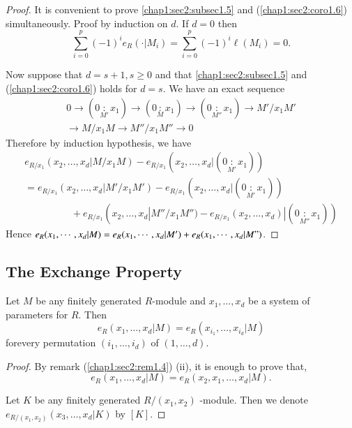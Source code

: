 \begin{proof}
  It is convenient to prove \ref{chap1:sec2:subsec1.5} and
  (\ref{chap1:sec2:coro1.6}) simultaneously. Proof by 
  induction on $d$. If $d=0$ then 
  $$
  \sum_{i=0}^{p} (-1)^i e_R (\cdot |M_i) = \sum^{p}_{i=0} (-1)^i \ell (M_i) = 0.
  $$
  
  Now suppose that $d = s + 1, s \geq 0$ and that
  \ref{chap1:sec2:subsec1.5} and (\ref{chap1:sec2:coro1.6}) 
  holds for $d=s$. We have an exact sequence 
  \begin{multline*}
    0 \to (0 \underset{M'}{:} x_1) \to (0 \underset{M}{:}x_1) \to (0
    \underset{M''}{:}x_1) \to M'/x_1M'\\
    \to M/x_1 M \to M'' /x_1 M'' \to 0 
  \end{multline*}
  Therefore by induction hypothesis, we have
{\fontsize{10pt}{12pt}\selectfont
  \begin{multline*}
    e_{R/x_1} (x_2, \ldots,  x_d |M/x_1 M) - e_{R/x_1} (x_2, \ldots,
    x_d |(0\underset{M'}{:} x_1))\\ 
    = e_{R/x_1} (x_2, \ldots, x_d | M'/x_1 M') -e_{R/x_1} (x_2,
    \ldots, x_d | (0\underset{M'}{:} x_1))\\ 
    \hspace{2cm}+ e_{R/x_1} (x_2, \ldots,  x_d |M''/x_1 M'') -e_{R/x_1}
    (x_2, \ldots,  x_d) | (0\underset{M''}{:} x_1)) 
  \end{multline*}}\relax
  Hence $e_R (x_1, \cdots,  x_d |M) = e_R (x_1, \cdots,  x_d |M') +
  e_R (x_1, \cdots,  x_d |M")$. 
\end{proof}

\setcounter{subsection}{6}
\subsection{The Exchange Property}\label{chap1:sec2:subsec1.7}

Let $M$ be any finitely generated $R$-module and $x_1, \ldots,
  x_d$ be a system of parameters for $R$. Then 
$$
e_R (x_1, \ldots,  x_d |M) = e_R (x_{i_1}, \ldots,  x_{i_d} |M)
$$
for\pageoriginale every permutation $(i_1, \ldots, i_d)$ of $(1, \ldots, d)$.

\begin{proof}
  By remark (\ref{chap1:sec2:rem1.4}) (ii), it is enough to prove that,
  $$
  e_R (x_1, \ldots,  x_d |M) = e_R (x_2, x_1, \ldots, x_d | M).
  $$

  Let $K$ be any finitely generated $R/(x_1, x_2)$ -module. Then we
  denote $e_{R/(x_1, x_2)} (x_3, \ldots, x_d | K) $ by $[K]$. 
\end{proof}

